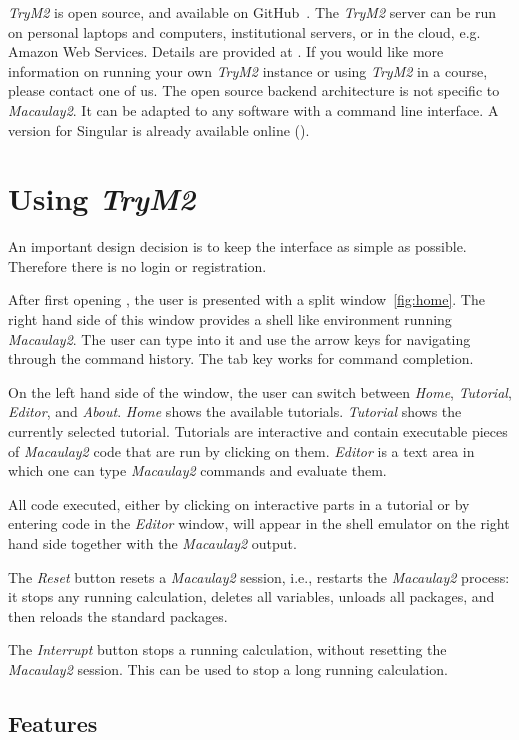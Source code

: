 \documentclass[twocolumn]{article}
\def\trym2{{\it TryM2}}
\def\M2{{\it Macaulay2}}
\begin{document}
\trym2 is open source, and available on GitHub~\cite{github}.  The
\trym2 server can be run on personal laptops and computers,
institutional servers, or in the cloud, e.g. Amazon Web Services.
Details are provided at \cite{github}.  If you would like more
information on running your own \trym2 instance or using \trym2 in a
course, please contact one of us.  The open source backend
architecture is not specific to \M2.  It can be adapted to any
software with a command line interface.  A version for Singular
is already available online (\cite{trySingular}).

\section{Using \trym2}

An important design decision is to keep the interface as simple as
possible.  Therefore there is no login or registration.

After first opening \cite{webM2}, the user is presented with a split
window~\ref{fig:home}.  The right hand side of this window provides a
shell like environment running \M2. The user can type into it and use
the arrow keys for navigating through the command history.
The tab key works for command completion.

On the left hand side of the window, the user can switch between {\it Home}, {\it
  Tutorial}, {\it Editor}, and {\it About}. {\it Home} shows the available
 tutorials. {\it Tutorial} shows the currently selected
tutorial. Tutorials are interactive and contain executable pieces of
\M2 code that are run by clicking on them. {\it Editor} is a
text area in which one can type \M2 commands and evaluate them.

All code executed, either by clicking on interactive parts in a
tutorial or by entering code in the {\it Editor} window, will appear in 
the shell emulator on the right hand side together with the \M2 output.

The {\it Reset} button resets a \M2 session, i.e., restarts 
the \M2 process: it stops any running calculation, deletes all variables, 
unloads all packages, and then reloads the standard packages.

The {\it Interrupt} button stops a running calculation, without
resetting the \M2 session. This can be used to stop a long running
calculation.

\subsection{Features}
\end{document}
